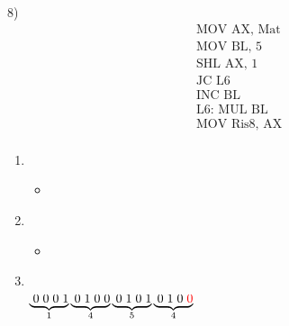 
\newpage

\textsf{\large{\color{red} 8) }} \\

\begin{align*}
	&\text{MOV AX, Mat} \\
	&\text{MOV BL, 5} \\
	&\text{SHL AX, 1} \\
	&\text{JC L6} \\
	&\text{INC BL} \\
	&\text{L6: MUL BL} \\
	&\text{MOV Ris8, AX} \\
\end{align*}

\begin{enumerate}
	\item {} \\
	\begin{itemize}
		\item {} \\
	\end{itemize}
	\item {} \\
	\begin{itemize}
		\item {} \\
	\end{itemize}
	\item {} \\
	\color{red}\sout{}\normalcolor $\underbrace{\hspace{.1cm}0\hspace{.1cm}0\hspace{.1cm}0\hspace{.1cm}1} _{1} \underbrace{\hspace{.1cm}0\hspace{.1cm}1\hspace{.1cm}0\hspace{.1cm}0} _{4} \underbrace{\hspace{.1cm}0\hspace{.1cm}1\hspace{.1cm}0\hspace{.1cm}1} _{5}  \underbrace{\hspace{.1cm}0\hspace{.1cm}1\hspace{.1cm}0\hspace{.1cm}\color{red}0}_{\normalcolor 4}$ \\

\end{enumerate}
